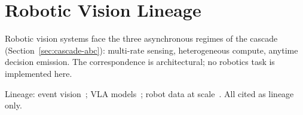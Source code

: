 \section{Robotic Vision Lineage}
\label{sec:robotic-vision-lineage}

Robotic vision systems face the three asynchronous regimes of the
cascade (Section~\ref{sec:cascade-abc}): multi-rate sensing,
heterogeneous compute, anytime decision emission. The correspondence
is architectural; no robotics task is implemented here.

Lineage: event vision~\citep{gallego2022eventvision}; VLA
models~\citep{brohan2023rt2,kim2024openvla,octo2024}; robot data at
scale~\citep{khazatsky2024droid}. All cited as lineage only.
